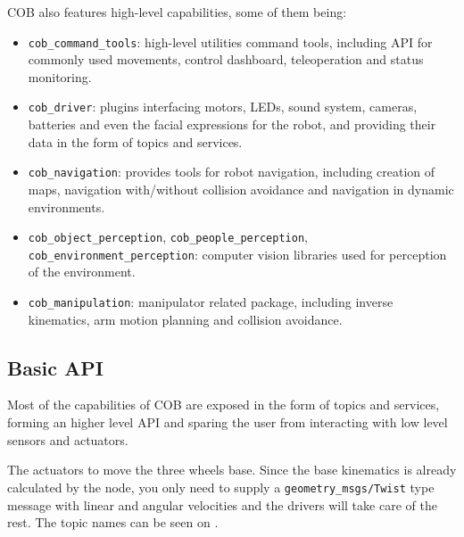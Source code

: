 COB also features high-level capabilities, some of them being:

\begin{itemize}
\item \texttt{cob\_command\_tools}: high-level utilities command tools, including API for commonly used movements, control dashboard, teleoperation and status monitoring.
\item \texttt{cob\_driver}: plugins interfacing motors, LEDs, sound system, cameras, batteries and even the facial expressions for the robot, and providing their data in the form of topics and services.
\item \texttt{cob\_navigation}: provides tools for robot navigation, including creation of maps, navigation with/without collision avoidance and navigation in dynamic environments.
\item \texttt{cob\_object\_perception}, \texttt{cob\_people\_perception}, \texttt{cob\_environment\_perception}: computer vision libraries used for perception of the environment.
\item \texttt{cob\_manipulation}: manipulator related package, including inverse kinematics, arm motion planning and collision avoidance.
\end{itemize}

\subsection{Basic API}

Most of the capabilities of COB are exposed in the form of topics and services, forming an higher level API and sparing the user from interacting with low level sensors and actuators.

The actuators to move the three wheels base. Since the base kinematics is already calculated by the node, you only need to supply a \texttt{geometry\_msgs/Twist} type message with linear and angular velocities and the drivers will take care of the rest. The topic names can be seen on .

